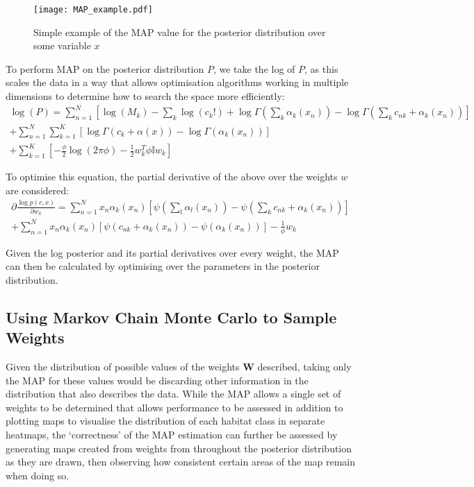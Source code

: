 \begin{figure}
    \texttt{[image: MAP\_example.pdf]}
    \caption{Simple example of the MAP value for the posterior distribution over some variable $x$}
    \label{fig:MAP-ex}
\end{figure}

To perform MAP on the posterior distribution $P$, we take the log of $P$, as this scales the data in a way that allows optimisation algorithms working in multiple dimensions to determine how to search the space more efficiently:
\begin{multline}
    \log(P) = \sum^N_{n=1} [\log(M_k) - \sum_k \log(c_k!) + \log \Gamma(\sum_k \alpha_k(x_n)) - \log \Gamma(\sum_k c_{nk} + \alpha_k(x_n))] \\
    + \sum^N_{n=1} \sum^K_{k=1} [\log \Gamma(c_k + \alpha(x)) - \log \Gamma(\alpha_k(x_n))] \\
    + \sum^K_{k=1} [-\frac{\phi}{2} \log(2\pi \phi) - \frac{1}{2}w_k^T \phi \mathbb{I} w_k]
\end{multline}

To optimise this equation, the partial derivative of the above over the weights $w$ are considered:
\begin{multline}
    \partial \frac{\log p(c, x)}{\partial w_k} = \sum_{n=1}^N x_n \alpha_k (x_n) [\psi(\sum_l \alpha_l(x_n)) - \psi(\sum_k c_{nk} + \alpha_k(x_n))] \\
    + \sum^N_{n=1} x_n \alpha_k (x_n) [\psi (c_{nk} + \alpha_k(x_n)) - \psi(\alpha_k(x_n))] - \frac{1}{\phi} w_k
\end{multline}


Given the log posterior and its partial derivatives over every weight, the MAP can then be calculated by optimising over the parameters in the posterior distribution.

\subsection{Using Markov Chain Monte Carlo to Sample Weights}
Given the distribution of possible values of the weights $\mathbf{W}$ described, taking only the MAP for these values would be discarding other information in the distribution that also describes the data. While the MAP allows a single set of weights to be determined that allows performance to be assessed in addition to plotting maps to visualise the distribution of each habitat class in separate heatmaps, the `correctness' of the MAP estimation can further be assessed by generating maps created from weights from throughout the posterior distribution as they are drawn, then observing how consistent certain areas of the map remain when doing so.

